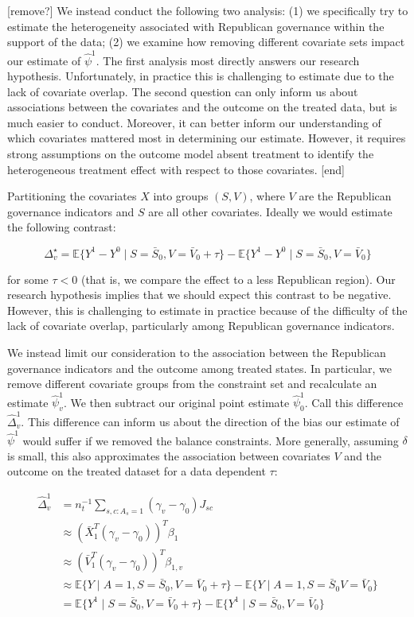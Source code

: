 \documentclass[aoas]{imsart}
\theoremstyle{plain}
\theoremstyle{remark}
\begin{document}
[remove?]
We instead conduct the following two analysis: (1) we specifically try to estimate the heterogeneity associated with Republican governance within the support of the data; (2) we examine how removing different covariate sets impact our estimate of $\hat{\psi}^1$. The first analysis most directly answers our research hypothesis. Unfortunately, in practice this is challenging to estimate due to the lack of covariate overlap. 
The second question can only inform us about associations between the covariates and the outcome on the treated data, but is much easier to conduct. Moreover, it can better inform our understanding of which covariates mattered most in determining our estimate. However, it requires strong assumptions on the outcome model absent treatment to identify the heterogeneous treatment effect with respect to those covariates.
[end]

Partitioning the covariates $X$ into groups $(S, V)$, where $V$ are the Republican governance indicators and $S$ are all other covariates. Ideally we would estimate the following contrast:

$$
\Delta^\star_v = \mathbb{E}\{Y^1 - Y^0 \mid S = \bar{S}_0, V = \bar{V}_0 + \tau\} - \mathbb{E}\{Y^1 - Y^0 \mid S = \bar{S}_0, V = \bar{V}_0\}
$$

for some $\tau < 0$ (that is, we compare the effect to a less Republican region). Our research hypothesis implies that we should expect this contrast to be negative. However, this is challenging to estimate in practice because of the difficulty of the lack of covariate overlap, particularly among Republican governance indicators. 

We instead limit our consideration to the association between the Republican governance indicators and the outcome among treated states. In particular, we remove different covariate groups from the constraint set and recalculate an estimate $\hat{\psi}^1_v$. We then subtract our original point estimate $\hat{\psi}^1_0$. Call this difference $\hat{\Delta}^1_v$. This difference  can inform us about the direction of the bias our estimate of $\hat{\psi}^1$ would suffer if we removed the balance constraints. More generally, assuming $\delta$ is small, this also approximates the association between covariates $V$ and the outcome on the treated dataset for a data dependent $\tau$:

\begin{align*}
    \hat{\Delta}^1_v &= n_t^{-1}\sum_{s, c: A_s = 1}(\gamma_v - \gamma_0)J_{sc} \\ 
    &\approx (\bar{X}_1^T(\gamma_v - \gamma_0))^T\beta_1 \\
    &\approx (\bar{V}_1^T(\gamma_v - \gamma_0))^T\beta_{1, v} \\
    &\approx \mathbb{E}\{Y \mid A = 1, S = \bar{S}_0, V = \bar{V}_0 + \tau\} - \mathbb{E}\{Y \mid A = 1, S = \bar{S}_0 V = \bar{V}_0\} \\
    &= \mathbb{E}\{Y^1 \mid S = \bar{S}_0, V = \bar{V}_0 + \tau\} - \mathbb{E}\{Y^1 \mid S = \bar{S}_0, V = \bar{V}_0\} \\
\end{align*}
\end{document}
